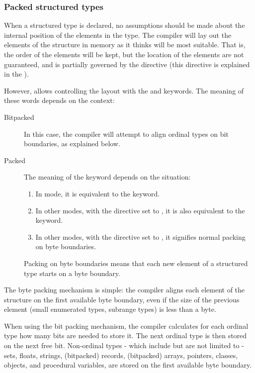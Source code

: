\subsubsection{Packed structured types}
When a structured type is declared, no assumptions should be made about
the internal position of the elements in the type. The compiler will lay
out  the elements of the structure in memory as it thinks will be most
suitable. That is, the order of the elements will be kept, but the location
of the elements are not guaranteed, and is partially governed by the 
directive (this directive is explained in the \progref).

 
However, \fpc allows controlling the layout with the  and
 keywords. The meaning of these words depends on the context:
\begin{description}
\item[Bitpacked] In this case, the compiler will attempt to align ordinal
types on bit boundaries, as explained below.
\item[Packed] The meaning of the  keyword depends on the
situation:
\begin{enumerate}
\item In  mode, it is equivalent to the  keyword.
\item In other modes, with the  directive set to ,
it is also equivalent to the  keyword.
\item In other modes, with the  directive set to ,
it signifies normal packing on byte boundaries.
\end{enumerate}
Packing on byte boundaries means that each new element of a structured type
starts on a byte boundary.
\end{description}

The byte packing mechanism is simple: the compiler aligns each element of
the structure on the first available byte boundary, even if the size of the
previous element (small enumerated types, subrange types) is less than a
byte.

When using the bit packing mechanism, the compiler calculates for each
ordinal type how many bits are needed to store it. The next ordinal type
is then stored on the next free bit. Non-ordinal types - which include but
are not limited to - sets, floats, strings, (bitpacked) records, (bitpacked)
arrays, pointers, classes, objects, and procedural variables, are stored
on the first available byte boundary.

